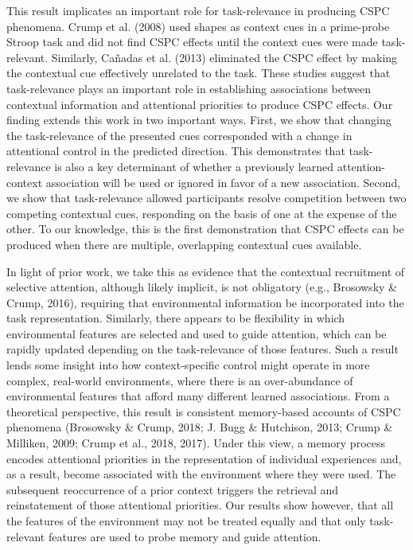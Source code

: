 \documentclass[english,,man,floatsintext]{apa6}
\begin{document}
This result implicates an important role for task-relevance in producing
CSPC phenomena. Crump et al. (2008) used shapes as context cues in a
prime-probe Stroop task and did not find CSPC effects until the context
cues were made task-relevant. Similarly, Cañadas et al. (2013)
eliminated the CSPC effect by making the contextual cue effectively
unrelated to the task. These studies suggest that task-relevance plays
an important role in establishing associations between contextual
information and attentional priorities to produce CSPC effects. Our
finding extends this work in two important ways. First, we show that
changing the task-relevance of the presented cues corresponded with a
change in attentional control in the predicted direction. This
demonstrates that task-relevance is also a key determinant of whether a
previously learned attention-context association will be used or ignored
in favor of a new association. Second, we show that task-relevance
allowed participants resolve competition between two competing
contextual cues, responding on the basis of one at the expense of the
other. To our knowledge, this is the first demonstration that CSPC
effects can be produced when there are multiple, overlapping contextual
cues available.

In light of prior work, we take this as evidence that the contextual
recruitment of selective attention, although likely implicit, is not
obligatory (e.g., Brosowsky \& Crump, 2016), requiring that
environmental information be incorporated into the task representation.
Similarly, there appears to be flexibility in which environmental
features are selected and used to guide attention, which can be rapidly
updated depending on the task-relevance of those features. Such a result
lends some insight into how context-specific control might operate in
more complex, real-world environments, where there is an over-abundance
of environmental features that afford many different learned
associations. From a theoretical perspective, this result is consistent
memory-based accounts of CSPC phenomena (Brosowsky \& Crump, 2018; J.
Bugg \& Hutchison, 2013; Crump \& Milliken, 2009; Crump et al., 2018,
2017). Under this view, a memory process encodes attentional priorities
in the representation of individual experiences and, as a result, become
associated with the environment where they were used. The subsequent
reoccurrence of a prior context triggers the retrieval and reinstatement
of those attentional priorities. Our results show however, that all the
features of the environment may not be treated equally and that only
task-relevant features are used to probe memory and guide attention.
\end{document}
